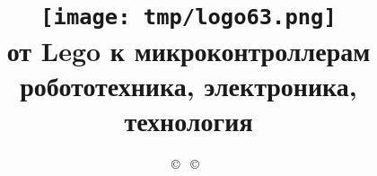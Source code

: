 

\title{\texttt{[image: tmp/logo63.png]}\\
{\Huge от Lego к микроконтроллерам}\\
робототехника, электроника, технология}

\author{ 
\copyright\ 
\copyright\ 
}



\maketitle

\def\contentsname{\empty}
\tableofcontents\secdown



























